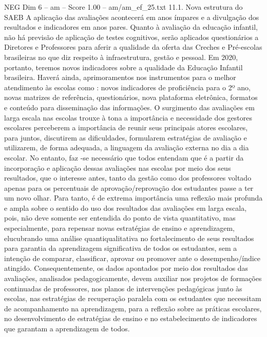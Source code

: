 \begin{textsample}{NEG Dim 6 – am – Score 1.00 – am/am\_ef\_25.txt}  \label{ex:f6_neg_026}
11.1.
Nova estrutura do SAEB A aplicação das avaliações acontecerá em anos ímpares e a divulgação dos resultados e indicadores em anos pares.
Quanto à avaliação da educação infantil, não há previsão de aplicação de testes cognitivos, serão aplicados questionários a Diretores e Professores para aferir a qualidade da oferta das Creches e Pré-escolas brasileiras no que diz respeito à infraestrutura, gestão e pessoal.
Em 2020, portanto, teremos novos indicadores sobre a qualidade da Educação Infantil brasileira.
Haverá ainda, aprimoramentos nos instrumentos para o melhor atendimento às escolas como : novos indicadores de proficiência para o 2º ano, novas matrizes de referência, questionários, nova plataforma eletrônica, formatos e conteúdo para disseminação das informações.
O surgimento das avaliações em larga escala nas escolas trouxe à tona a importância e necessidade dos gestores escolares perceberem a importância de reunir seus principais atores escolares, para juntos, discutirem as dificuldades, formularem estratégias de avaliação e utilizarem, de forma adequada, a linguagem da avaliação externa no dia a dia escolar.
No entanto, faz -se necessário que todos entendam que é a partir da incorporação e aplicação dessas avaliações nas escolas por meio dos seus resultados, que o interesse antes, tanto da gestão como dos professores voltado apenas para os percentuais de aprovação/reprovação dos estudantes passe a ter um novo olhar.
Para tanto, é de extrema importância uma reflexão mais profunda e ampla sobre o sentido do uso dos resultados das avaliações em larga escala, pois, não deve somente ser entendida do ponto de vista quantitativo, mas especialmente, para repensar novas estratégias de ensino e aprendizagem, elucubrando uma análise quantiqualitativa no fortalecimento de seus resultados para garantia da aprendizagem significativa de todos os estudantes, sem a intenção de comparar, classificar, aprovar ou promover ante o desempenho/índice atingido.
Consequentemente, os dados apontados por meio dos resultados das avaliações, analisados pedagogicamente, devem auxiliar nos projetos de formações continuadas de professores, nos planos de intervenções pedagógicas junto às escolas, nas estratégias de recuperação paralela com os estudantes que necessitam de acompanhamento na aprendizagem, para a reflexão sobre as práticas escolares, no desenvolvimento de estratégias de ensino e no estabelecimento de indicadores que garantam a aprendizagem de todos.

\end{textsample}
